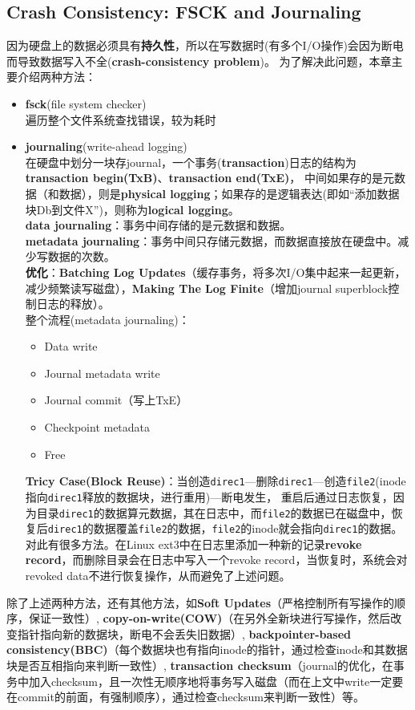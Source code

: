 \documentclass{article}
\begin{document}
\subsection{Crash Consistency: FSCK and Journaling}
因为硬盘上的数据必须具有\textbf{持久性}，所以在写数据时(有多个I/O操作)会因为断电而导致数据写入不全(\textbf{crash-consistency problem})。
为了解决此问题，本章主要介绍两种方法：
\begin{itemize}
    \item \textbf{fsck}(file system checker) \\
    遍历整个文件系统查找错误，较为耗时
    \item \textbf{journaling}(write-ahead logging) \\
    在硬盘中划分一块存journal，一个事务(\textbf{transaction})日志的结构为\textbf{transaction begin(TxB)}、\textbf{transaction end(TxE)}，
    中间如果存的是元数据（和数据），则是\textbf{physical logging}；如果存的是逻辑表达(即如“添加数据块Db到文件X”)，则称为\textbf{logical logging}。 \\
    \textbf{data journaling}：事务中间存储的是元数据和数据。 \\
    \textbf{metadata journaling}：事务中间只存储元数据，而数据直接放在硬盘中。减少写数据的次数。 \\
    \textbf{优化}：\textbf{Batching Log Updates}（缓存事务，将多次I/O集中起来一起更新，减少频繁读写磁盘），\textbf{Making The Log Finite}（增加journal superblock控制日志的释放）。 \\
    整个流程(metadata journaling)：
    \begin{itemize}
        \item Data write
        \item Journal metadata write
        \item Journal commit（写上TxE）
        \item Checkpoint metadata
        \item Free
    \end{itemize}
    \textbf{}
    \textbf{Tricy Case(Block Reuse)}：当创造\texttt{direc1}---删除\texttt{direc1}---创造\texttt{file2}(inode指向\texttt{direc1}释放的数据块，进行重用)---断电发生，
    重启后通过日志恢复，因为目录\texttt{direc1}的数据算元数据，其在日志中，而\texttt{file2}的数据已在磁盘中，恢复后\texttt{direc1}的数据覆盖\texttt{file2}的数据，\texttt{file2}的inode就会指向\texttt{direc1}的数据。
    对此有很多方法。在Linux ext3中在日志里添加一种新的记录\textbf{revoke record}，而删除目录会在日志中写入一个revoke record，当恢复时，系统会对revoked data不进行恢复操作，从而避免了上述问题。
\end{itemize}
除了上述两种方法，还有其他方法，如\textbf{Soft Updates}（严格控制所有写操作的顺序，保证一致性）, \textbf{copy-on-write(COW)}（在另外全新块进行写操作，然后改变指针指向新的数据块，断电不会丢失旧数据）, \textbf{backpointer-based consistency(BBC)}（每个数据块也有指向inode的指针，通过检查inode和其数据块是否互相指向来判断一致性）, \textbf{transaction checksum}（journal的优化，在事务中加入checksum，且一次性无顺序地将事务写入磁盘（而在上文中write一定要在commit的前面，有强制顺序），通过检查checksum来判断一致性）等。
\end{document}
